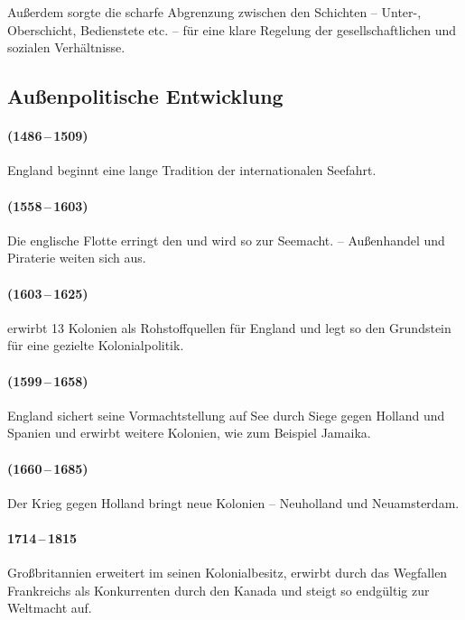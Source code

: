 Außerdem sorgte die scharfe Abgrenzung zwischen den Schichten --
Unter-, Oberschicht, Bedienstete etc. -- für eine klare Regelung der
gesellschaftlichen und sozialen Verhältnisse. 


\subsection{Außenpolitische Entwicklung}

\paragraph{ (1486\,--\,1509)} England beginnt eine lange
Tradition der internationalen Seefahrt.

\paragraph{ (1558\,--\,1603)} Die englische Flotte
erringt den  und wird so zur
Seemacht. -- Außenhandel und Piraterie weiten sich aus.

\paragraph{ (1603\,--\,1625)} erwirbt 13 Kolonien als
Rohstoffquellen für England und legt so den Grundstein für eine
gezielte Kolonialpolitik.

\paragraph{
(1599\,--\,1658)} England sichert seine Vormachtstellung auf See durch
Siege gegen Holland und Spanien und erwirbt weitere Kolonien, wie zum
Beispiel Jamaika.

\paragraph{ (1660\,--\,1685)} Der Krieg gegen
Holland bringt neue Kolonien -- Neuholland und Neuamsterdam.

\paragraph{1714\,--\,1815} Großbritannien erweitert im  seinen Kolonialbesitz, erwirbt durch das
Wegfallen Frankreichs als Konkurrenten durch den  Kanada und steigt so endgültig zur Weltmacht
auf.\\

